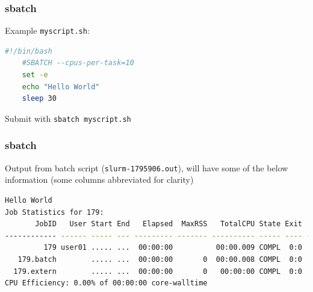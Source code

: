 \documentclass{beamer}
\newcommand{\code}[1]{\colorbox{codegray}{\texttt{#1}}}
\begin{document}
\begin{frame}[fragile]
\frametitle{sbatch}
Example \code{myscript.sh}: 
\begin{lstlisting}[backgroundcolor = \color{codegray}, language = Bash, showstringspaces=false]
    #!/bin/bash
    #SBATCH --cpus-per-task=10
    set -e
    echo "Hello World"
    sleep 30
\end{lstlisting}
\bigskip
\bigskip
Submit with \code{sbatch myscript.sh}
\end{frame}


\begin{frame}[fragile]
\frametitle{sbatch}
Output from batch script (\code{slurm-1795906.out}), will have some of the below information (some columns abbreviated for clarity)
\begingroup
\tiny
\begin{lstlisting}[backgroundcolor = \color{codegray}, language = Bash, showstringspaces=false]
Hello World
Job Statistics for 179:
       JobID   User Start End   Elapsed  MaxRSS   TotalCPU State Exit  NodeList
------------ ------ ----- --- --------- ------- ---------- ----- ---- ---------
         179 user01 ..... ...  00:00:00          00:00.009 COMPL  0:0    node01
   179.batch        ..... ...  00:00:00       0  00:00.008 COMPL  0:0    node01
  179.extern        ..... ...  00:00:00       0   00:00:00 COMPL  0:0    node01
CPU Efficiency: 0.00% of 00:00:00 core-walltime
\end{lstlisting}
\endgroup
\end{frame}





\end{document}
